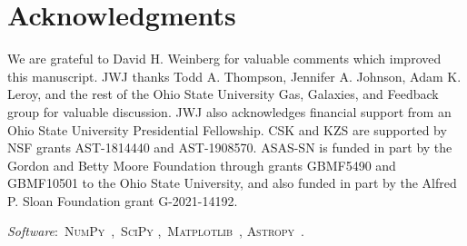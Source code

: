 \documentclass[ms.tex]{subfiles}
\begin{document}
\section{Acknowledgments}
\label{sec:acknowledgments}

We are grateful to David H. Weinberg for valuable comments which improved this
manuscript.
JWJ thanks Todd A. Thompson, Jennifer A. Johnson, Adam K. Leroy, and the rest
of the Ohio State University Gas, Galaxies, and Feedback group for valuable
discussion.
JWJ also acknowledges financial support from an Ohio State University
Presidential Fellowship.
CSK and KZS are supported by NSF grants AST-1814440 and AST-1908570.
ASAS-SN is funded in part by the Gordon and Betty Moore Foundation through
grants GBMF5490 and GBMF10501 to the Ohio State University, and also funded in
part by the Alfred P. Sloan Foundation grant G-2021-14192.
\par\null\par\noindent
\textit{Software}:~\textsc{NumPy}~\citep{Harris2020},~\textsc{SciPy}
\citep{Virtanen2020},~\textsc{Matplotlib}~\citep{Hunter2007},
\textsc{Astropy}~\citep{Astropy2013, Astropy2018, Astropy2022}.
\end{document}
